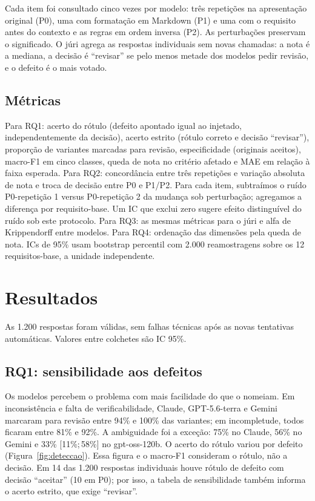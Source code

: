\documentclass[12pt]{article}
\newcommand{\IC}[2]{[#1;\,#2]}
\begin{document}
Cada item foi consultado cinco vezes por modelo: três repetições na apresentação original (P0), uma com formatação em Markdown (P1) e uma com o requisito antes do contexto e as regras em ordem inversa (P2). As perturbações preservam o significado. O júri agrega as respostas individuais sem novas chamadas: a nota é a mediana, a decisão é ``revisar'' se pelo menos metade dos modelos pedir revisão, e o defeito é o mais votado.

\subsection{Métricas}

Para RQ1: acerto do rótulo (defeito apontado igual ao injetado, independentemente da decisão), acerto estrito (rótulo correto e decisão ``revisar''), proporção de variantes marcadas para revisão, especificidade (originais aceitos), macro-F1 em cinco classes, queda de nota no critério afetado e MAE em relação à faixa esperada. Para RQ2: concordância entre três repetições e variação absoluta de nota e troca de decisão entre P0 e P1/P2. Para cada item, subtraímos o ruído P0-repetição 1 versus P0-repetição 2 da mudança sob perturbação; agregamos a diferença por requisito-base. Um IC que exclui zero sugere efeito distinguível do ruído sob este protocolo. Para RQ3: as mesmas métricas para o júri e alfa de Krippendorff entre modelos. Para RQ4: ordenação das dimensões pela queda de nota. ICs de 95\% usam bootstrap percentil com 2.000 reamostragens sobre os 12 requisitos-base, a unidade independente.

\section{Resultados}

As 1.200 respostas foram válidas, sem falhas técnicas após as novas tentativas automáticas. Valores entre colchetes são IC 95\%.

\subsection{RQ1: sensibilidade aos defeitos}

Os modelos percebem o problema com mais facilidade do que o nomeiam. Em inconsistência e falta de verificabilidade, Claude, GPT-5.6-terra e Gemini marcaram para revisão entre 94\% e 100\% das variantes; em incompletude, todos ficaram entre 81\% e 92\%. A ambiguidade foi a exceção: 75\% no Claude, 56\% no Gemini e 33\% \IC{11\%}{58\%} no gpt-oss-120b. O acerto do rótulo variou por defeito (Figura~\ref{fig:deteccao}). Essa figura e o macro-F1 consideram o rótulo, não a decisão. Em 14 das 1.200 respostas individuais houve rótulo de defeito com decisão ``aceitar'' (10 em P0); por isso, a tabela de sensibilidade também informa o acerto estrito, que exige ``revisar''.
\end{document}
